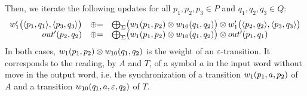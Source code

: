 \noindent
Then, we iterate the following updates for all $p_1, p_2, p_3\in P$ and $q_1, q_2, q_3 \in Q$:
\[
\begin{array}{rcl}
\wei'_1\bigl( \< p_1, q_1>, \< p_3, q_3>\bigr) & \opluseq &
\bigoplus_\Sigma \bigl(\wei_{1}(p_1, p_2) \otimes \wei_{10}(q_1, q_2)\bigr)
\otimes \wei'_1\bigl( \< p_2, q_2>, \< p_3, q_3>\bigr)\\
%
\final'(p_2, q_2) & \opluseq &
\bigoplus_\Sigma \bigl(\wei_{1}(p_1, p_2)\otimes \wei_{10}(q_1, q_2)\bigr)
\otimes \final'(p_1, q_1)
\end{array}
\]
In both cases, 
$\wei_{1}(p_1, p_2) \otimes \wei_{10}(q_1, q_2)$ 
is the weight of an $\varepsilon$-transition.
It corresponds to the reading, by $A$ and $T$, 
of a symbol $a$ in the input word without move in the output word,
i.e. the synchronization of 
a transition $\wei_{1}(p_1, a, p_2)$ of $A$ and 
a transition $\wei_{10}(q_1, a, \varepsilon, q_2)$ of $T$.

